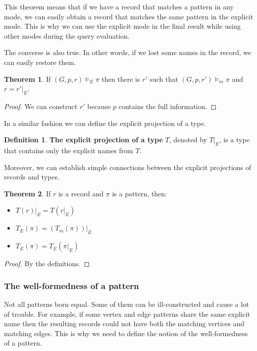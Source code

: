 \documentclass[14pt]{constructor-thesis}
\theoremstyle{definition}
\newtheorem{theorem}{Theorem}
\newtheorem{definition}{Definition}
\begin{document}
This theorem means that if we have a record that matches a pattern in any mode, we can easily obtain a record that matches the same pattern in the explicit mode. This is why we can use the explicit mode in the final result while using other modes during the query evaluation.

The converse is also true. In other words, if we lost some names in the record, we can easily restore them.
\begin{theorem}
  \label{thm:matching-mode-widen}
  If $(G, p, r) \models_E \pi$ then there is $r'$ such that $(G, p, r')\models_m \pi$ and $r = r'|_E$.
\end{theorem}
\begin{proof}
  We can construct $r'$ because $p$ contains the full information.
\end{proof}

In a similar fashion we can define the explicit projection of a type.
\begin{definition}
  \textbf{The explicit projection of a type} $T$, denoted by $T |_E$, is a type that contains only the explicit names from $T$.
\end{definition}

Moreover, we can establish simple connections between the explicit projections of records and types.
\begin{theorem}
  \label{thm:explicit-projections-and-types}
  If $r$ is a record and $\pi$ is a pattern, then:
  \begin{itemize}
    \item $T(r)|_E = T(r|_E)$
    \item $T_E(\pi) = (T_m(\pi)) |_E$
    \item $T_E(\pi) = T_E(\pi |_E)$
  \end{itemize}
\end{theorem}
\begin{proof}
  By the definitions.
\end{proof}

\subsubsection{The well-formedness of a pattern}

Not all patterns born equal. Some of them can be ill-constructed and cause a lot of trouble. For example, if some vertex and edge patterns share the same explicit name then the resulting records could not have both the matching vertices and matching edges. This is why we need to define the notion of the well-formedness of a pattern.
\end{document}
